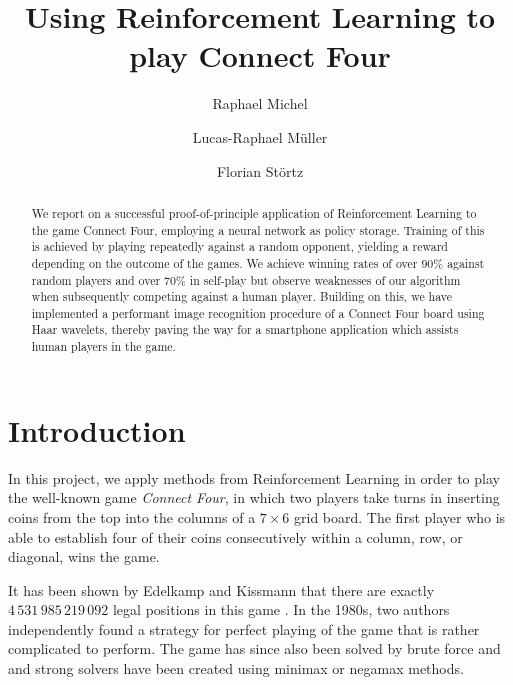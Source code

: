 \documentclass[10pt,twocolumn,letterpaper]{article}
\begin{document}
\title{Using Reinforcement Learning to play Connect Four}

\author{Raphael Michel
\and
Lucas-Raphael Müller
\and
Florian Störtz
}

\maketitle

\begin{abstract}
   We report on a successful proof-of-principle application of Reinforcement Learning to the game Connect Four, employing a neural network as policy storage. Training of this is achieved by playing repeatedly against a random opponent, yielding a reward depending on the outcome of the games. We achieve winning rates of over $90\%$ against random players and over $70\%$ in self-play but observe weaknesses of our algorithm when subsequently competing against a human player. Building on this, we have implemented a performant image recognition procedure of a Connect Four board using Haar wavelets, thereby paving the way for a smartphone application which assists human players in the game.
\end{abstract}

\section{Introduction}

In this project, we apply methods from Reinforcement Learning in order to play
the well-known game \emph{Connect Four}, in which two players take turns in
inserting coins from the top into the columns of a $7\times 6$ grid board.
The first player who is able to establish four of their coins consecutively
within a column, row, or diagonal, wins the game.

It has been shown by Edelkamp and Kissmann that there are exactly $4\,531\,985\,219\,092$ legal positions in this game \cite{Edelkamp2008}. In the 1980s, two authors independently found a strategy for perfect playing of the game \cite{Allis88, Allen1990} that is rather complicated to perform. The game has since also been solved by brute force and and strong solvers have been created using minimax or negamax methods.
\end{document}
